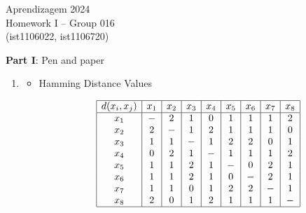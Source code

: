 \documentclass[12pt]{article}
\begin{document}
\center
Aprendizagem 2024\\
Homework I -- Group 016\\
(ist1106022, ist1106720)\vskip 1cm

\large{\textbf{Part I}: Pen and paper}\normalsize

\begin{enumerate}[leftmargin=\labelsep, label=\textbf{\arabic*.)}]
    \item \begin{itemize}
              \item Hamming Distance Values \\
                    \vspace{0.5em}
                    \begin{minipage}{1\textwidth}
                        \begin{center}
                            \[\begin{array}{|c|c|c|c|c|c|c|c|c|}
                                    \hline
                                    d(x_i, x_j) & x_1 & x_2 & x_3 & x_4 & x_5 & x_6 & x_7 & x_8 \\
                                    \hline
                                    x_1         & -   & 2   & 1   & 0   & 1   & 1   & 1   & 2   \\
                                    x_2         & 2   & -   & 1   & 2   & 1   & 1   & 1   & 0   \\
                                    x_3         & 1   & 1   & -   & 1   & 2   & 2   & 0   & 1   \\
                                    x_4         & 0   & 2   & 1   & -   & 1   & 1   & 1   & 2   \\
                                    x_5         & 1   & 1   & 2   & 1   & -   & 0   & 2   & 1   \\
                                    x_6         & 1   & 1   & 2   & 1   & 0   & -   & 2   & 1   \\
                                    x_7         & 1   & 1   & 0   & 1   & 2   & 2   & -   & 1   \\
                                    x_8         & 2   & 0   & 1   & 2   & 1   & 1   & 1   & -   \\
                                    \hline
                                \end{array}\]
                        \end{center}
                    \end{minipage}


\end{itemize}
\end{enumerate}
\end{document}

